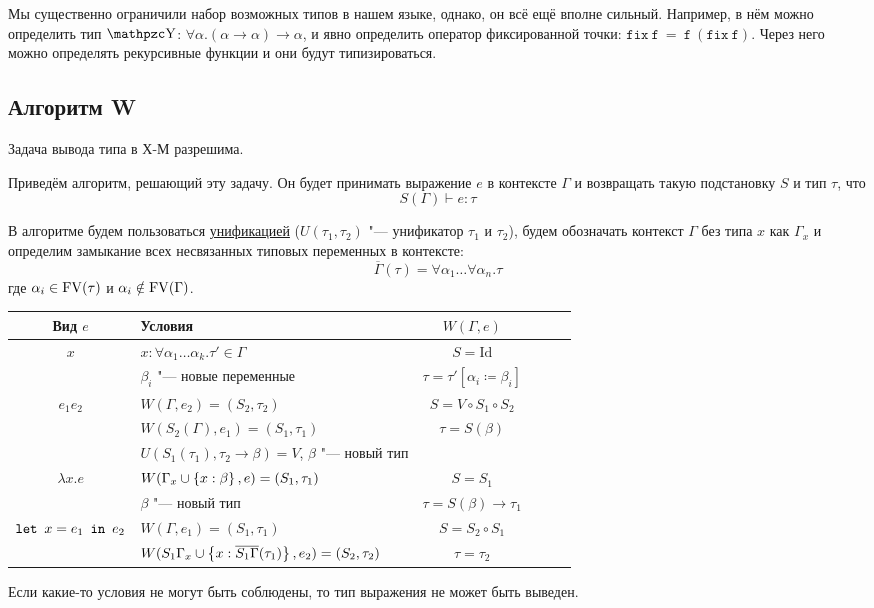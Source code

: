 Мы существенно ограничили набор возможных типов в нашем языке, однако, он всё ещё вполне сильный.
Например, в нём можно определить тип $\comb Y$: $\forall \alpha . (\alpha\rightarrow\alpha)\rightarrow\alpha$,
и явно определить оператор фиксированной точки: $\mathtt{fix~f~=~f~(fix~f)}$.
Через него можно определять рекурсивные функции и они будут типизироваться.

\subsection{\texorpdfstring{Алгоритм W}{Algorithm W}}
\begin{statement}
    Задача вывода типа в Х-М разрешима.
\end{statement}
Приведём алгоритм, решающий эту задачу.
Он будет принимать выражение $e$ в контексте $\Gamma$ и возвращать такую подстановку $S$ и тип $\tau$, что
\[
    S(\Gamma) \vdash e : \tau
\]

В алгоритме будем пользоваться \hyperref[unificator]{унификацией} ($U(\tau_1, \tau_2)$ "--- унификатор $\tau_1$ и $\tau_2$),
будем обозначать контекст $\Gamma$ без типа $x$ как $\Gamma_x$
и определим замыкание всех несвязанных типовых переменных в контексте:
\[
    \overline{\Gamma}(\tau) = \forall \alpha_1 \ldots \forall \alpha_n . \tau
\]
где $\alpha_i \in \operatorname{FV}(\tau)$ и $\alpha_i \notin \operatorname{FV}(\Gamma)$.

\begin{center}
\begin{tabular}{Sl Sl Sl} \toprule
    Вид $e$ & Условия & $W(\Gamma, e)$ \\ \toprule
    $x$
        & $x : \forall \alpha_1 \ldots \alpha_k . \tau' \in \Gamma$ & $S =\mathrm{Id}$ \\
        & $\beta_i$ "--- новые переменные                           & $\tau = \tau'[\alpha_i \coloneqq \beta_i]$ \\
        \midrule
    $e_1 e_2$
            & $W(\Gamma, e_2) = (S_2, \tau_2)$                                       & $S = V \circ S_1 \circ S_2$ \\
            & $W(S_2(\Gamma), e_1) = (S_1, \tau_1)$                                  & $\tau = S(\beta)$ \\
            & $U(S_1(\tau_1), \tau_2 \rightarrow \beta) = V$, $\beta$ "--- новый тип & \\ \midrule
    $\lambda x . e$
        & $W(\Gamma_x \cup \left\{x : \beta\right\}, e) = (S_1, \tau_1)$ & $S = S_1$  \\
        & $\beta$ "--- новый тип                                & $\tau = S(\beta) \rightarrow \tau_1$ \\ \midrule
    $\mathinner{\mathtt{let}}~x=e_1~\mathinner{\mathtt{in}}~e_2$
        & $W(\Gamma, e_1) = (S_1, \tau_1)$                                                     & $S = S_2 \circ S_1$ \\
        & $W(S_1 \Gamma_x \cup \left\{x : \overline{S_1 \Gamma} (\tau_1)\right\}, e_2) = (S_2, \tau_2)$ & $\tau = \tau_2$ \\ \bottomrule
\end{tabular}
\end{center}

Если какие-то условия не могут быть соблюдены, то тип выражения не может быть выведен.

\begin{example}
\todo
\end{example}

